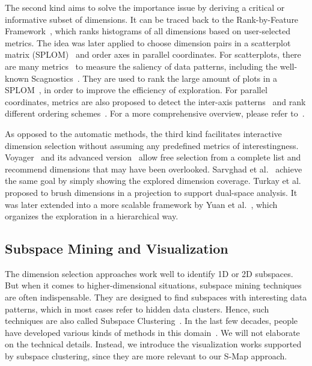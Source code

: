 The second kind aims to solve the importance issue by deriving a critical or informative subset of dimensions. It can be traced back to the Rank-by-Feature Framework~\cite{SeoS05}, which ranks histograms of all dimensions based on user-selected metrics. The idea was later applied to choose dimension pairs in a scatterplot matrix (SPLOM)~\cite{carr1987scatterplot} and order axes in parallel coordinates. For scatterplots, there are many metrics~\cite{DBLP:journals/cgf/JohanssonC08, DBLP:journals/cgf/SipsNLH09, DBLP:conf/ieeevast/TatuAESTMK09} to measure the saliency of data patterns, including the well-known Scagnostics~\cite{DBLP:conf/infovis/WilkinsonAG05, DBLP:journals/tvcg/WilkinsonAG06}. They are used to rank the large amount of plots in a SPLOM~\cite{DBLP:journals/ivs/Guo03, DBLP:conf/apvis/NhonW14}, in order to improve the efficiency of exploration. For parallel coordinates, metrics are also proposed to detect the inter-axis patterns~\cite{DBLP:journals/cgf/JohanssonC08, DBLP:journals/tvcg/DasguptaK10} and rank different ordering schemes~\cite{DBLP:conf/infovis/PengWR04, DBLP:journals/tvcg/JohanssonJ09}. For a more comprehensive overview, please refer to~\cite{DBLP:journals/tvcg/Bertini11}.

As opposed to the automatic methods, the third kind facilitates interactive dimension selection without assuming any predefined metrics of interestingness. Voyager~\cite{DBLP:journals/tvcg/WongsuphasawatM16} and its advanced version~\cite{DBLP:conf/chi/WongsuphasawatQ17} allow free selection from a complete list and recommend dimensions that may have been overlooked. Sarvghad et al.~\cite{DBLP:journals/tvcg/SarvghadTM17} achieve the same goal by simply showing the explored dimension coverage. Turkay et al.~\cite{DBLP:journals/tvcg/TurkayFH11} proposed to brush dimensions in a projection to support dual-space analysis. It was later extended into a more scalable framework by Yuan et al.~\cite{DBLP:journals/tvcg/YuanRWG13}, which organizes the exploration in a hierarchical way.

\subsection{Subspace Mining and Visualization}

The dimension selection approaches work well to identify 1D or 2D subspaces. But when it comes to higher-dimensional situations, subspace mining techniques are often indispensable. They are designed to find subspaces with interesting data patterns, which in most cases refer to hidden data clusters. Hence, such techniques are also called Subspace Clustering~\cite{DBLP:conf/sigmod/AgrawalGGR98}. In the last few decades, people have developed various kinds of methods in this domain~\cite{DBLP:journals/spm/Vidal11}. We will not elaborate on the technical details. Instead, we introduce the visualization works supported by subspace clustering, since they are more relevant to our S-Map approach.


